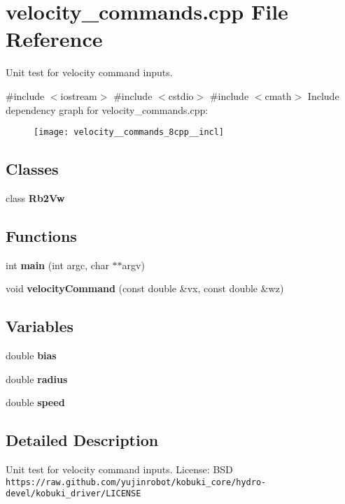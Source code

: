 \section{velocity\-\_\-commands.\-cpp \-File \-Reference}
\label{velocity__commands_8cpp}


\-Unit test for velocity command inputs.  


{\ttfamily \#include $<$iostream$>$}\*
{\ttfamily \#include $<$cstdio$>$}\*
{\ttfamily \#include $<$cmath$>$}\*
\-Include dependency graph for velocity\-\_\-commands.\-cpp\-:
\nopagebreak
\begin{figure}[H]
\begin{center}
\leavevmode
\texttt{[image: velocity\_\_commands\_8cpp\_\_incl]}
\end{center}
\end{figure}
\subsection*{\-Classes}
\begin{DoxyCompactItemize}
\item 
class {\bf \-Rb2\-Vw}
\end{DoxyCompactItemize}
\subsection*{\-Functions}
\begin{DoxyCompactItemize}
\item 
int {\bf main} (int argc, char $\ast$$\ast$argv)
\item 
void {\bf velocity\-Command} (const double \&vx, const double \&wz)
\end{DoxyCompactItemize}
\subsection*{\-Variables}
\begin{DoxyCompactItemize}
\item 
double {\bf bias}
\item 
double {\bf radius}
\item 
double {\bf speed}
\end{DoxyCompactItemize}


\subsection{\-Detailed \-Description}
\-Unit test for velocity command inputs. \-License\-: \-B\-S\-D {\tt https\-://raw.\-github.\-com/yujinrobot/kobuki\-\_\-core/hydro-\/devel/kobuki\-\_\-driver/\-L\-I\-C\-E\-N\-S\-E} 

